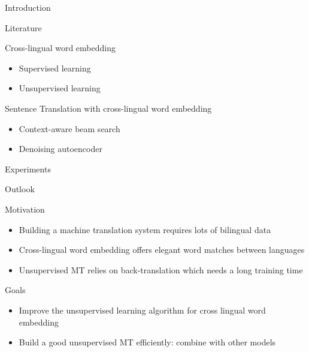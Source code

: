 \documentclass[11pt, a4paper, landscape]{article}
\begin{document}
	\TitlePage
	
	\NewPage
	
	
	\vfill
	\begin{description}
		\item Introduction
		\item Literature
		\item Cross-lingual word embedding
		\begin{itemize}
			\item Supervised learning
			\item Unsupervised learning
		\end{itemize}
		\item Sentence Translation with cross-lingual word embedding
		\begin{itemize}
			\item Context-aware beam search
			\item Denoising autoencoder
		\end{itemize}
		\item Experiments

		\item Outlook
	\end{description}
	\vfill
	
	\NewPage
	
	\vfill
	\begin{description}
		\item Motivation
		\begin{itemize}
			\item Building a machine translation system requires lots of bilingual data
			\item Cross-lingual word embedding offers elegant word matches between languages
			\item Unsupervised MT relies on back-translation which needs a long training time
		\end{itemize}
		\item Goals
		\begin{itemize}
			\item Improve the unsupervised learning algorithm for cross lingual word embedding
			\item Build a good unsupervised MT efficiently: combine with other models
		\end{itemize}
		
	\end{description}
	\vfill
	
\end{document}
